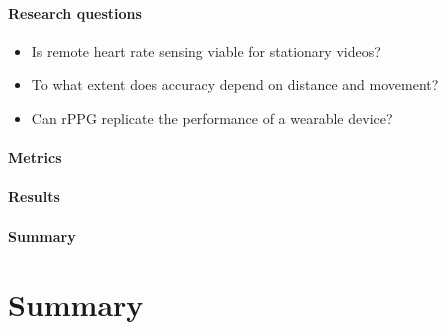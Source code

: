 \paragraph{Research questions}

\begin{itemize}
    \item Is remote heart rate sensing viable for stationary videos?
    \item To what extent does accuracy depend on distance and movement?
    \item Can rPPG replicate the performance of a wearable device?
\end{itemize}
\paragraph{Metrics}
\paragraph{Results}

\paragraph{Summary}


\section{Summary}